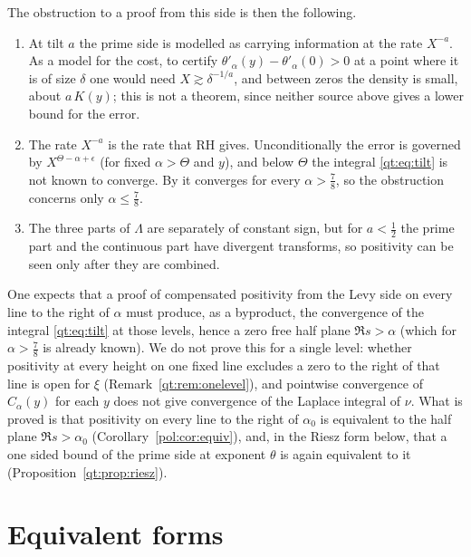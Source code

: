 The obstruction to a proof from this side is then the following.
\begin{enumerate}
\item At tilt $a$ the prime side is modelled as carrying information at the rate $X^{-a}$. As a model for the cost, to certify $\theta'_\alpha(y)-\theta'_\alpha(0)>0$ at a point where it is of size $\delta$ one would need $X\gtrsim\delta^{-1/a}$, and between zeros the density is small, about $a\,K(y)$; this is not a theorem, since neither source above gives a lower bound for the error.
\item The rate $X^{-a}$ is the rate that RH gives. Unconditionally the error is governed by $X^{\Theta-\alpha+\epsilon}$ (for fixed $\alpha>\Theta$ and $y$), and below $\Theta$ the integral \eqref{qt:eq:tilt} is not known to converge. By \cite{OAI26a} it converges for every $\alpha>\tfrac78$, so the obstruction concerns only $\alpha\le\tfrac78$.
\item The three parts of $\Lambda$ are separately of constant sign, but for $a<\tfrac12$ the prime part and the continuous part have divergent transforms, so positivity can be seen only after they are combined.
\end{enumerate}

\begin{remark}\label{qt:rem:obstruction}
One expects that a proof of compensated positivity from the Levy side on every line to the right of $\alpha$ must produce, as a byproduct, the convergence of the integral \eqref{qt:eq:tilt} at those levels, hence a zero free half plane $\Re s>\alpha$ (which for $\alpha>\tfrac78$ is already known). We do not prove this for a single level: whether positivity at every height on one fixed line excludes a zero to the right of that line is open for $\xi$ (Remark~\ref{qt:rem:onelevel}), and pointwise convergence of $C_\alpha(y)$ for each $y$ does not give convergence of the Laplace integral of $\nu$. What is proved is that positivity on every line to the right of $\alpha_0$ is equivalent to the half plane $\Re s>\alpha_0$ (Corollary~\ref{pol:cor:equiv}), and, in the Riesz form below, that a one sided bound of the prime side at exponent $\theta$ is again equivalent to it (Proposition~\ref{qt:prop:riesz}).
\end{remark}

\section{Equivalent forms}\label{qt:sec:equiv}

